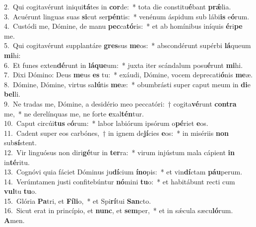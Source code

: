 {2.~}Qui cogitavérunt iniqui\textbf{tá}tes in \textbf{cor}de:~* tota die constitu\textbf{é}bant \textbf{prǽ}lia.\\
{3.~}Acuérunt linguas suas \textbf{si}cut ser\textbf{pén}tis:~* venénum áspidum sub lábi\textbf{is} e\textbf{ó}rum.\\
{4.~}Custódi me, Dómine, de manu \textbf{pec}ca\textbf{tó}ris:~* et ab homínibus iníquis \textbf{é}ri\textbf{pe} me.\\
{5.~}Qui cogitavérunt supplantáre \textbf{gres}sus \textbf{me}os:~* abscondérunt supérbi \textbf{lá}queum \textbf{mi}hi:\\
{6.~}Et funes exten\textbf{dé}runt in \textbf{lá}\textbf{que}um:~* juxta iter scándalum posu\textbf{é}runt \textbf{mi}hi.\\
{7.~}Dixi Dómino: Deus \textbf{me}us \textbf{es} tu:~* exáudi, Dómine, vocem deprecati\textbf{ó}nis \textbf{me}æ.\\
{8.~}Dómine, Dómine, virtus sa\textbf{lú}tis \textbf{me}æ:~* obumbrásti super caput meum in \textbf{di}e \textbf{bel}li.\\
{9.~}Ne tradas me, Dómine, a desidério meo peccatóri:~† cogita\textbf{vé}runt \textbf{con}\textbf{tra} me,~* ne derelínquas me, ne forte \textbf{e}xal\textbf{tén}tur.\\
{10.~}Caput circúi\textbf{tus} e\textbf{ó}rum:~* labor labiórum ipsórum o\textbf{pé}riet \textbf{e}os.\\
{11.~}Cadent super eos carbónes,~† in ignem de\textbf{jí}cies \textbf{e}os:~* in misériis \textbf{non} sub\textbf{sí}stent.\\
{12.~}Vir linguósus non diri\textbf{gé}tur in \textbf{ter}ra:~* virum injústum mala cápient \textbf{in} in\textbf{té}ritu.\\
{13.~}Cognóvi quia fáciet Dóminus ju\textbf{dí}cium \textbf{í}\textbf{no}pis:~* et vin\textbf{dí}ctam \textbf{páu}perum.\\
{14.~}Verúmtamen justi confitebúntur \textbf{nó}mini \textbf{tu}o:~* et habitábunt recti cum \textbf{vul}tu \textbf{tu}o.\\
{15.~}Glória \textbf{Pa}tri, et \textbf{Fí}\textbf{li}o,~* et Spi\textbf{rí}tui \textbf{San}cto.\\
{16.~}Sicut erat in princípio, et \textbf{nunc}, et \textbf{sem}per,~* et in sǽcula sæcu\textbf{ló}rum. \textbf{A}men.\\
